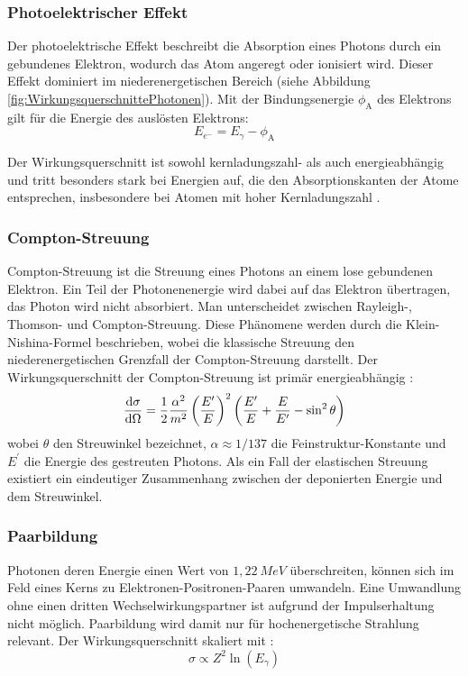 		\subsubsection{Photoelektrischer Effekt}
		Der photoelektrische Effekt beschreibt die Absorption eines Photons durch ein gebundenes Elektron, wodurch das Atom angeregt oder ionisiert wird. Dieser Effekt dominiert im niederenergetischen Bereich (siehe Abbildung \ref{fig:WirkungsquerschnittePhotonen}). Mit der Bindungsenergie $\phi_{\text{A}}$ des Elektrons gilt für die Energie des auslösten Elektrons:
		\begin{equation*}
			E_{e^{-}}= E_{\gamma}-\phi_{\text{A}}
		\end{equation*} 
		
		\noindent Der Wirkungsquerschnitt ist sowohl kernladungszahl- als auch energieabhängig und tritt besonders stark bei Energien auf, die den Absorptionskanten der Atome entsprechen, insbesondere bei Atomen mit hoher Kernladungszahl  \cite{Leo}.
		
		
		\subsubsection{Compton-Streuung}
		Compton-Streuung ist die Streuung eines Photons an einem lose gebundenen Elektron. Ein Teil der Photonenenergie wird dabei auf das Elektron übertragen, das Photon wird nicht absorbiert. Man unterscheidet zwischen Rayleigh-, Thomson- und Compton-Streuung. Diese Phänomene werden durch die Klein-Nishina-Formel beschrieben, wobei die klassische Streuung den niederenergetischen Grenzfall der Compton-Streuung darstellt. Der Wirkungsquerschnitt der Compton-Streuung ist primär energieabhängig  \cite{Leo}:
		\begin{equation*}
			{\displaystyle \dv{\sigma}{\Omega}={\frac {1}{2}}{\frac {\alpha ^{2}}{m^{2}}}\left({\frac {E'}{E}}\right)^{2}\left({\frac {E'}{E}}+{\frac {E}{E'}}-\sin ^{2}\theta \right)}
		\end{equation*}
		wobei $\theta$ den Streuwinkel bezeichnet, $\alpha\approx 1/137$ die Feinstruktur-Konstante und $E^{\prime}$ die Energie des gestreuten Photons. Als ein Fall der elastischen Streuung existiert ein eindeutiger Zusammenhang zwischen der deponierten Energie und dem Streuwinkel.
		
		\subsubsection{Paarbildung}
		Photonen deren Energie einen Wert von $1,22\ \si{MeV}$ überschreiten, können sich im Feld eines Kerns zu Elektronen-Positronen-Paaren umwandeln. Eine Umwandlung ohne einen dritten Wechselwirkungspartner ist aufgrund der Impulserhaltung nicht möglich. Paarbildung wird damit nur für hochenergetische Strahlung relevant. Der Wirkungsquerschnitt skaliert mit \cite{DemtroderKerne}:
		\begin{equation*}
			\sigma \propto Z^{2}\ln(E_{\gamma})
		\end{equation*} 
		

